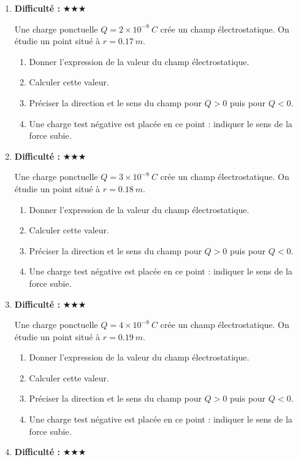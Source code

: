 \documentclass[11pt,a4paper]{article}
\newcommand{\etoiles}[1]{\textbf{Difficulté : }#1}
\begin{document}
\begin{enumerate}[label=\textbf{Exercice \arabic*.},leftmargin=*]
Une charge ponctuelle $Q=1\times10^{-8}\ \si{C}$ crée un champ électrostatique. On étudie un point situé à $r=0.16\ \si{m}$.
\begin{enumerate}[label=\alph*)]
\item Donner l'expression de la valeur du champ électrostatique.
\item Calculer cette valeur.
\item Préciser la direction et le sens du champ pour $Q>0$ puis pour $Q<0$.
\item Une charge test négative est placée en ce point : indiquer le sens de la force subie.
\end{enumerate}
\item \etoiles{★★★}

Une charge ponctuelle $Q=2\times10^{-8}\ \si{C}$ crée un champ électrostatique. On étudie un point situé à $r=0.17\ \si{m}$.
\begin{enumerate}[label=\alph*)]
\item Donner l'expression de la valeur du champ électrostatique.
\item Calculer cette valeur.
\item Préciser la direction et le sens du champ pour $Q>0$ puis pour $Q<0$.
\item Une charge test négative est placée en ce point : indiquer le sens de la force subie.
\end{enumerate}
\item \etoiles{★★★}

Une charge ponctuelle $Q=3\times10^{-8}\ \si{C}$ crée un champ électrostatique. On étudie un point situé à $r=0.18\ \si{m}$.
\begin{enumerate}[label=\alph*)]
\item Donner l'expression de la valeur du champ électrostatique.
\item Calculer cette valeur.
\item Préciser la direction et le sens du champ pour $Q>0$ puis pour $Q<0$.
\item Une charge test négative est placée en ce point : indiquer le sens de la force subie.
\end{enumerate}
\item \etoiles{★★★}

Une charge ponctuelle $Q=4\times10^{-8}\ \si{C}$ crée un champ électrostatique. On étudie un point situé à $r=0.19\ \si{m}$.
\begin{enumerate}[label=\alph*)]
\item Donner l'expression de la valeur du champ électrostatique.
\item Calculer cette valeur.
\item Préciser la direction et le sens du champ pour $Q>0$ puis pour $Q<0$.
\item Une charge test négative est placée en ce point : indiquer le sens de la force subie.
\end{enumerate}
\item \etoiles{★★★}


\end{enumerate}
\end{document}
